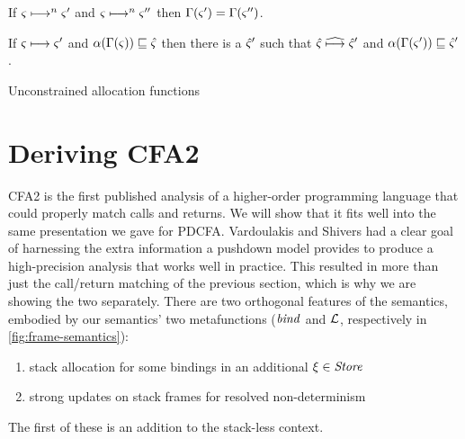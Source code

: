 \begin{theorem}\label{thm:gc-concrete}
  If $\varsigma \longmapsto^n \varsigma'$ and $\varsigma \longmapsto^n \varsigma''$ then $\Gamma(\varsigma') = \Gamma(\varsigma'')$.
\end{theorem}

\begin{theorem}\label{thm:gc-sound}
  If $\varsigma \longmapsto \varsigma'$ and $\alpha(\Gamma(\varsigma)) \sqsubseteq \hat\varsigma$ then there is a $\hat\varsigma'$ such that $\hat\varsigma \mathrel{\widehat{\longmapsto}} \hat\varsigma'$ and $\alpha(\Gamma(\varsigma')) \sqsubseteq \hat\varsigma'$.
\end{theorem}
%
Unconstrained allocation functions

\section{Deriving CFA2}
\label{sec:cfa2}

CFA2 is the first published analysis of a higher-order programming language that could properly match calls and returns.
%
We will show that it fits well into the same presentation we gave for PDCFA.
%
Vardoulakis and Shivers had a clear goal of harnessing the extra information a pushdown model provides to produce a high-precision analysis that works well in practice.
%
This resulted in more than just the call/return matching of the previous section, which is why we are showing the two separately.
%
There are two orthogonal features of the semantics, embodied by our semantics' two metafunctions ($\mathit{bind}$ and ${\mathcal L}$, respectively in \autoref{fig:frame-semantics}):
\begin{enumerate}
\item{stack allocation for some bindings in an additional $\xi \in \mathit{Store}$}
\item{strong updates on stack frames for resolved non-determinism}
\end{enumerate}
The first of these is an addition to the stack-less context.


